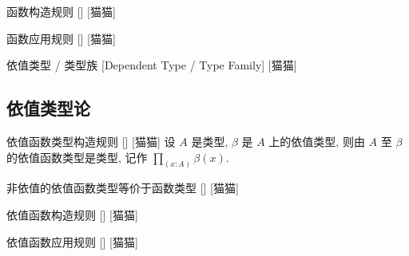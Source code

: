 \documentclass[UTF8]{ctexart}
\begin{document}
        \begin{axm}
            []
            {函数构造规则}
            []
            [猫猫]
        \end{axm}
        
        \begin{axm}
            []
            {函数应用规则}
            []
            [猫猫]
        \end{axm}
        
        \begin{dfn}
            {依值类型 / 类型族}
            [Dependent Type / Type Family]
            [猫猫]
        \end{dfn}
        

    \subsection{依值类型论}
        
        \begin{axm}
            []
            {依值函数类型构造规则}
            []
            [猫猫]
            设 \(A\) 是类型, \(\beta\) 是 \(A\) 上的依值类型, 则由 \(A\) 至 \(\beta\) 的依值函数类型是类型, 记作 \(\prod_{(x:A)} \beta(x)\). 
        \end{axm}
        
        \begin{ppt}
            []
            {非依值的依值函数类型等价于函数类型}
            []
            [猫猫]
        \end{ppt}

        \begin{axm}
            []
            {依值函数构造规则}
            []
            [猫猫]
        \end{axm}

        \begin{axm}
            []
            {依值函数应用规则}
            []
            [猫猫]
        \end{axm}

    
\end{document}
